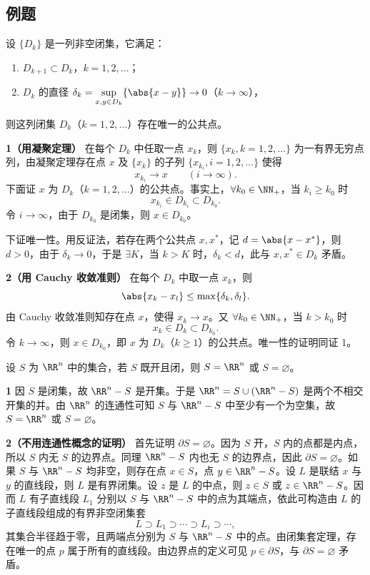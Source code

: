 \subsection{例题}

\begin{xexample}[17.2.1（闭集套定理）]
设 $\{D_k\}$ 是一列非空闭集，它满足：
\begin{enumerate}[label=(\arabic*)]
  \item $D_{k+1}\subset D_k$，$k=1,2,\ldots$；
  \item $D_k$ 的直径 $\delta_k=\displaystyle\sup_{x,y\in D_k}\{\abs{x-y}\}\to0$（$k\to\infty$），
\end{enumerate}
则这列闭集 $D_k$（$k=1,2,\ldots$）存在唯一的公共点。
\end{xexample}
\begin{xproof}
\textbf{1（用凝聚定理）} 在每个 $D_k$ 中任取一点 $x_k$，则 $\{x_k,k=1,2,\ldots\}$ 为一有界无穷点列，由凝聚定理存在点 $x$ 及 $\{x_k\}$ 的子列 $\{x_{k_i},i=1,2,\ldots\}$ 使得
\[
  x_{k_i}\to x\qquad(i\to\infty).
\]
下面证 $x$ 为 $D_k$（$k=1,2,\ldots$）的公共点。事实上，$\forall k_0\in\NN_+$，当 $k_i\geq k_0$ 时
\[
  x_{k_i}\in D_{k_i}\subset D_{k_0}.
\]
令 $i\to\infty$，由于 $D_{k_0}$ 是闭集，则 $x\in D_{k_0}$。

下证唯一性。用反证法，若存在两个公共点 $x,x^*$，记 $d=\abs{x-x^*}$，则 $d>0$，由于 $\delta_k\to0$，于是 $\exists K$，当 $k>K$ 时，$\delta_k<d$，此与 $x,x^*\in D_k$ 矛盾。
\end{xproof}
\begin{xproof}
\textbf{2（用 Cauchy 收敛准则）} 在每个 $D_k$ 中取一点 $x_k$，则
\[
  \abs{x_k-x_l}\leq\max\{\delta_k,\delta_l\}.
\]
由 Cauchy 收敛准则知存在点 $x$，使得 $x_k\to x$。又 $\forall k_0\in\NN_+$，当 $k>k_0$ 时
\[
  x_k\in D_k\subset D_{k_0}.
\]
令 $k\to\infty$，则 $x\in D_{k_0}$，即 $x$ 为 $D_k$（$k\geq1$）的公共点。唯一性的证明同证 1。
\end{xproof}

\begin{xexample}[17.2.2]
设 $S$ 为 $\RR^n$ 中的集合，若 $S$ 既开且闭，则 $S=\RR^n$ 或 $S=\varnothing$。
\end{xexample}
\begin{xproof}
\textbf{1} 因 $S$ 是闭集，故 $\RR^n-S$ 是开集。于是 $\RR^n=S\cup(\RR^n-S)$ 是两个不相交开集的并。由 $\RR^n$ 的连通性可知 $S$ 与 $\RR^n-S$ 中至少有一个为空集，故 $S=\RR^n$ 或 $S=\varnothing$。
\end{xproof}
\begin{xproof}
\textbf{2（不用连通性概念的证明）} 首先证明 $\partial S=\varnothing$。因为 $S$ 开，$S$ 内的点都是内点，所以 $S$ 内无 $S$ 的边界点。同理 $\RR^n-S$ 内也无 $S$ 的边界点，因此 $\partial S=\varnothing$。如果 $S$ 与 $\RR^n-S$ 均非空，则存在点 $x\in S$，点 $y\in\RR^n-S$。设 $L$ 是联结 $x$ 与 $y$ 的直线段，则 $L$ 是有界闭集。设 $z$ 是 $L$ 的中点，则 $z\in S$ 或 $z\in\RR^n-S$。因而 $L$ 有子直线段 $L_1$ 分别以 $S$ 与 $\RR^n-S$ 中的点为其端点，依此可构造由 $L$ 的子直线段组成的有界非空闭集套
\[
  L\supset L_1\supset\cdots\supset L_i\supset\cdots,
\]
其集合半径趋于零，且两端点分别为 $S$ 与 $\RR^n-S$ 中的点。由闭集套定理，存在唯一的点 $p$ 属于所有的直线段。由边界点的定义可见 $p\in\partial S$，与 $\partial S=\varnothing$ 矛盾。
\end{xproof}

